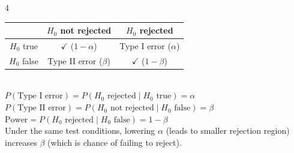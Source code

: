 \documentclass[12pt]{article}
\begin{document}
\begin{paracol}{4}
\begin{tcolorbox}[title=Confidence Intervals \& Hypothesis Testing, width=\columnwidth]
		\begin{tabular}{|c|c|c|}
			\hline
			            & $H_0$ not rejected        & $H_0$ rejected           \\ \hline
			$H_0$ true  & $\checkmark$ ($1-\alpha$) & Type I error ($\alpha$)  \\ \hline
			$H_0$ false & Type II error ($\beta$)   & $\checkmark$ ($1-\beta$) \\ \hline
		\end{tabular} \\
		$P(\text{Type I error}) = P(H_0 \text{ rejected} \mid H_0 \text{ true}) = \alpha$\\
		$P(\text{Type II error}) = P(H_0 \text{ not rejected} \mid H_0 \text{ false}) = \beta$\\
		$\text{Power} = P(H_0 \text{ rejected} \mid H_0 \text{ false}) = 1 - \beta$\\
		Under the same test conditions, lowering $\alpha$ (leads to smaller rejection region)
		increases $\beta$ (which is chance of failing to reject).
	\end{tcolorbox}
\end{paracol}
\end{document}

